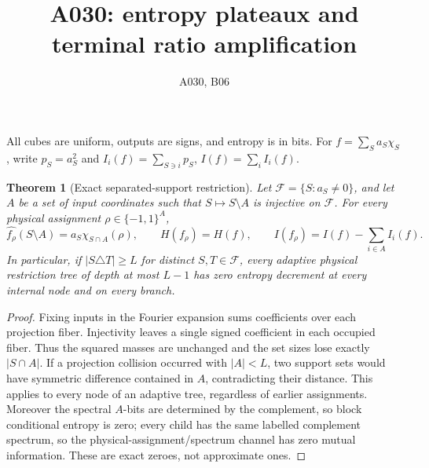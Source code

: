 \documentclass{article}
\newtheorem{theorem}{Theorem}
\begin{document}
\title{A030: entropy plateaux and terminal ratio amplification}
\author{A030, B06}\maketitle
All cubes are uniform, outputs are signs, and entropy is in bits.
For $f=\sum_S a_S\chi_S$, write $p_S=a_S^2$ and
$I_i(f)=\sum_{S\ni i}p_S$, $I(f)=\sum_i I_i(f)$.

\begin{theorem}[Exact separated-support restriction]
Let $\mathcal F=\{S:a_S\ne0\}$, and let $A$ be a set of input
coordinates such that $S\mapsto S\setminus A$ is injective on
$\mathcal F$. For every physical assignment $\rho\in\{-1,1\}^A$,
\[
 \widehat{f_\rho}(S\setminus A)=a_S\chi_{S\cap A}(\rho),\qquad
 H(f_\rho)=H(f),\qquad
 I(f_\rho)=I(f)-\sum_{i\in A}I_i(f).
\]
In particular, if $|S\triangle T|\ge L$ for distinct $S,T\in\mathcal F$,
every adaptive physical restriction tree of depth at most $L-1$ has
zero entropy decrement at every internal node and on every branch.
\end{theorem}
\begin{proof}
Fixing inputs in the Fourier expansion sums coefficients over each
projection fiber. Injectivity leaves a single signed coefficient in
each occupied fiber. Thus the squared masses are unchanged and
the set sizes lose exactly $|S\cap A|$. If a projection collision
occurred with $|A|<L$, two support sets would have symmetric difference
contained in $A$, contradicting their distance. This applies to every
node of an adaptive tree, regardless of earlier assignments.
Moreover the spectral $A$-bits are determined by the complement,
so block conditional entropy is zero; every child has the same labelled
complement spectrum, so the physical-assignment/spectrum channel has
zero mutual information. These are exact zeroes, not approximate ones.
\end{proof}
\end{document}
